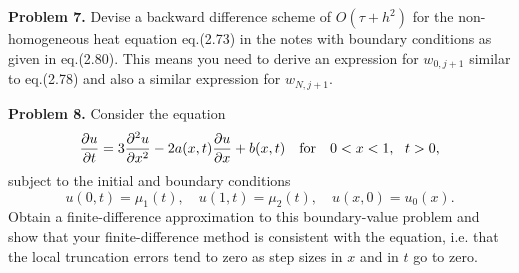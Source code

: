 \documentclass[10pt]{article}
\begin{document}
\vskip 0.5cm
\noindent
{\bf Problem 7.}
Devise a backward difference scheme of $O(\tau+h^2)$ for the non-homogeneous heat
equation eq.(2.73) in the notes with boundary conditions as given in eq.(2.80). This means
you need to derive an expression for $w_{0,j+1}$ similar to eq.(2.78) and also a similar
expression for $w_{N,j+1}$.

\vskip 0.5cm
\noindent
{\bf Problem 8.}
Consider the equation
\[
\frac{\partial u}{\partial t}=3\frac{\partial^{2}u}{\partial x^{2}}-
2a(x,t)\frac{\partial u}{\partial x}+b(x,t) \quad \hbox{for} \quad
0<x<1, \ \ t > 0,
\]
subject to the initial and boundary conditions
\[
u(0,t)=\mu_{1}(t), \quad u(1, t)=\mu_{2}(t),
\quad u(x, 0)=u_{0}(x) .
\]
Obtain a finite-difference approximation to this boundary-value
problem and show that your finite-difference method is consistent with the equation,
i.e. that the local truncation errors tend to zero as step sizes in $x$ and in $t$
go to zero.
\end{document}

